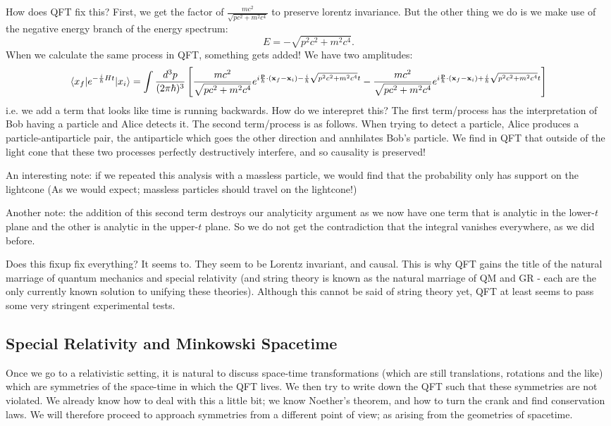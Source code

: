 How does QFT fix this? First, we get the factor of $\frac{mc^2}{\sqrt{pc^2 + m^2c^4}}$ to preserve lorentz invariance. But the other thing we do is we make use of the negative energy branch of the energy spectrum:
\begin{equation}
    E = -\sqrt{p^2c^2 + m^2c^4}.
\end{equation}
When we calculate the same process in QFT, something gets added! We have two amplitudes:
\begin{equation}
    \langle x_f \rvert e^{-\frac{i}{\hbar}Ht}\lvert x_i \rangle = \int \frac{d^3p}{(2\pi\hbar)^3}\left[\frac{mc^2}{\sqrt{pc^2 + m^2c^4}}e^{i\frac{\mathbf{p}}{\hbar}\cdot(\mathbf{x}_f - \mathbf{x}_i) -\frac{i}{\hbar}\sqrt{p^2c^2 + m^2c^4}t} - \frac{mc^2}{\sqrt{pc^2 + m^2c^4}}e^{i\frac{\mathbf{p}}{\hbar}\cdot(\mathbf{x}_f - \mathbf{x}_i) +\frac{i}{\hbar}\sqrt{p^2c^2 + m^2c^4}t}\right]
\end{equation}
i.e. we add a term that looks like time is running backwards. How do we interepret this? The first term/process has the interpretation of Bob having a particle and Alice detects it. The second term/process is as follows. When trying to detect a particle, Alice produces a particle-antiparticle pair, the antiparticle which goes the other direction and annhilates Bob's particle. We find in QFT that outside of the light cone that these two processes perfectly destructively interfere, and so causality is preserved!

An interesting note: if we repeated this analysis with a massless particle, we would find that the probability only has support on the lightcone (As we would expect; massless particles should travel on the lightcone!)

Another note: the addition of this second term destroys our analyticity argument as we now have one term that is analytic in the lower-$t$ plane and the other is analytic in the upper-$t$ plane. So we do not get the contradiction that the integral vanishes everywhere, as we did before.

Does this fixup fix everything? It seems to. They seem to be Lorentz invariant, and causal. This is why QFT gains the title of the natural marriage of quantum mechanics and special relativity (and string theory is known as the natural marriage of QM and GR - each are the only currently known solution to unifying these theories). Although this cannot be said of string theory yet, QFT at least seems to pass some very stringent experimental tests.

\subsection{Special Relativity and Minkowski Spacetime}
Once we go to a relativistic setting, it is natural to discuss space-time transformations (which are still translations, rotations and the like) which are symmetries of the space-time in which the QFT lives. We then try to write down the QFT such that these symmetries are not violated. We already know how to deal with this a little bit; we know Noether's theorem, and how to turn the crank and find conservation laws. We will therefore proceed to approach symmetries from a different point of view; as arising from the geometries of spacetime.

